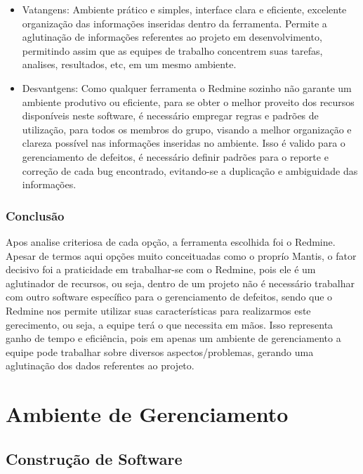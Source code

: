 \documentclass[12pt,a4paper]{article}
\begin{document}
			 \begin{itemize}
			 	\item Vatangens:
			 		Ambiente prático e simples, interface clara e eficiente, excelente organização das informações inseridas dentro da ferramenta. Permite a aglutinação de informações referentes ao projeto em desenvolvimento, permitindo assim que as equipes de trabalho  concentrem suas tarefas, analises, resultados, etc, em um mesmo ambiente. 
			 	
			 	\item Desvantgens:
			 		Como qualquer ferramenta o Redmine sozinho não garante um ambiente produtivo ou eficiente, para se obter o melhor proveito dos recursos disponíveis neste software, é necessário empregar regras e padrões de utilização, para todos os membros do grupo, visando a melhor organização e clareza possível nas informações inseridas no ambiente. Isso é valido para o gerenciamento de defeitos, é necessário definir padrões para o reporte e correção de cada bug encontrado, evitando-se a duplicação e ambiguidade das informações. 
			 	
			 \end{itemize}
			 
		
		\subsubsection{Conclusão}
		
			Apos analise criteriosa de cada opção, a ferramenta escolhida foi o Redmine. 
			Apesar de termos aqui opções muito conceituadas como o proprío Mantis, o fator decisivo foi a praticidade em trabalhar-se com o Redmine, 
			pois ele é um aglutinador de recursos, ou seja, dentro de um projeto não é necessário trabalhar com outro software específico para o gerenciamento de defeitos, 
			sendo que o Redmine nos permite utilizar suas características para realizarmos este gerecimento, ou seja, a equipe terá o que necessita em mãos. 
			Isso representa ganho de tempo e eficiência, pois em apenas um ambiente de gerenciamento a equipe pode trabalhar sobre diversos aspectos/problemas, 
			gerando uma aglutinação dos dados referentes ao projeto.
		
				

\clearpage		
\section{Ambiente de Gerenciamento}
	\subsection{Construção de Software}
\end{document}
